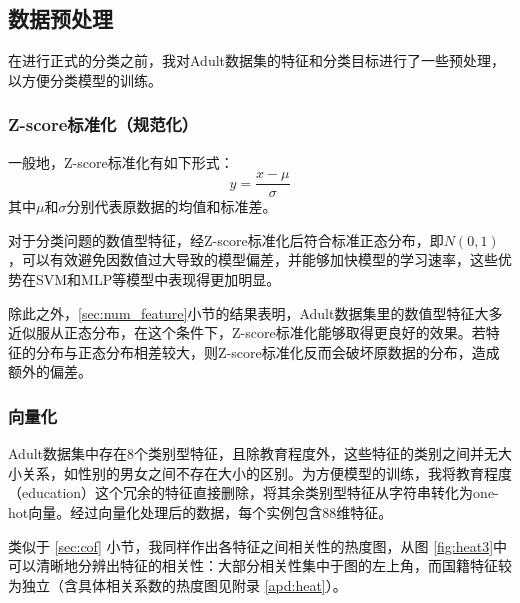 \documentclass[12pt,a4paper]{article}
\theoremstyle{definition}
\begin{document}
{\subsection{数据预处理}

在进行正式的分类之前，我对Adult数据集的特征和分类目标进行了一些预处理，以方便分类模型的训练。

\subsubsection{Z-score标准化（规范化）}

一般地，Z-score标准化有如下形式：
\begin{equation}
	y = \dfrac{x - \mu}{\sigma}
\end{equation}
其中$\mu$和$\sigma$分别代表原数据的均值和标准差。

\vspace{0.01\linewidth}
对于分类问题的数值型特征，经Z-score标准化后符合标准正态分布，即$N(0, 1)$，可以有效避免因数值过大导致的模型偏差，并能够加快模型的学习速率，这些优势在SVM和MLP等模型中表现得更加明显。

\vspace{0.01\linewidth}
除此之外，\ref{sec:num_feature}小节的结果表明，Adult数据集里的数值型特征大多近似服从正态分布，在这个条件下，Z-score标准化能够取得更良好的效果。若特征的分布与正态分布相差较大，则Z-score标准化反而会破坏原数据的分布，造成额外的偏差。

\subsubsection{向量化}

Adult数据集中存在8个类别型特征，且除教育程度外，这些特征的类别之间并无大小关系，如性别的男女之间不存在大小的区别。为方便模型的训练，我将教育程度（education）这个冗余的特征直接删除，将其余类别型特征从字符串转化为one-hot向量。经过向量化处理后的数据，每个实例包含88维特征。

\vspace{0.01\linewidth}
类似于 \ref{sec:cof} 小节，我同样作出各特征之间相关性的热度图，从图 \ref{fig:heat3}中可以清晰地分辨出特征的相关性：大部分相关性集中于图的左上角，而国籍特征较为独立（含具体相关系数的热度图见附录 \ref{apd:heat}）。

}
\end{document}

